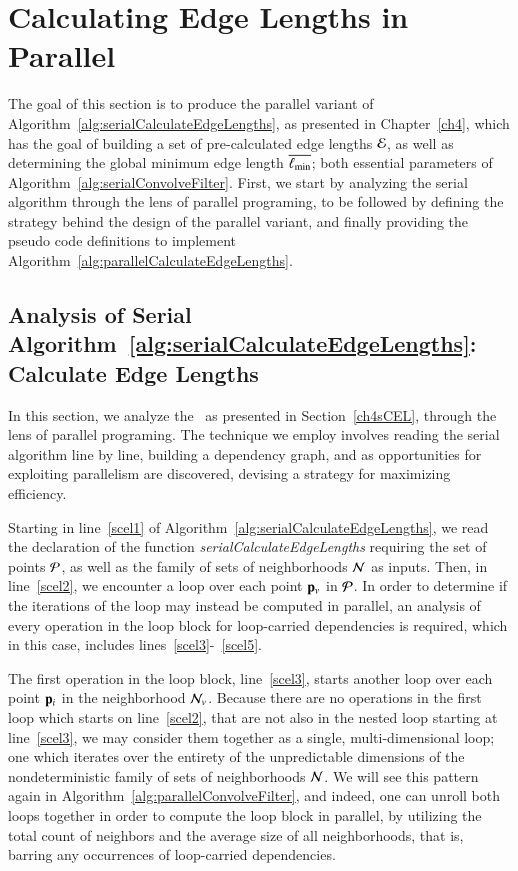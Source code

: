 %
%
%
%
\section{Calculating Edge Lengths in Parallel}
\label{ch5sCELP}
The goal of this section is to produce the parallel variant of  Algorithm~\ref{alg:serialCalculateEdgeLengths}, as presented in Chapter~\ref{ch4}, which has the goal of building a set of pre-calculated edge lengths $\mathcal{E}$, as well as determining the global minimum edge length $\overline{\ell_\text{min}}$; both essential parameters of Algorithm~\ref{alg:serialConvolveFilter}. First, we start by analyzing the serial algorithm through the lens of parallel programing, to be followed by defining the strategy behind the design of the parallel variant, and finally providing the pseudo code definitions to implement Algorithm~\ref{alg:parallelCalculateEdgeLengths}.


%
%
\subsection{Analysis of Serial Algorithm~\ref{alg:serialCalculateEdgeLengths}: Calculate Edge Lengths}
\label{ch5sCELPssASACEL}
In this section, we analyze the~ as presented in Section~\ref{ch4sCEL}, through the lens of parallel programing. The technique we employ involves reading the serial algorithm line by line, building a dependency graph, and as opportunities for exploiting parallelism are discovered, devising a strategy for maximizing efficiency.

Starting in line~\ref{scel1} of Algorithm~\ref{alg:serialCalculateEdgeLengths}, we read the declaration of the function \textit{serialCalculateEdgeLengths} requiring the set of points $\mathcal{P}$, as well as the family of sets of neighborhoods $\mathcal{N}$ as inputs. Then, in line~\ref{scel2}, we encounter a loop over each point $\mathbf{p}_v$ in $\mathcal{P}$. In order to determine if the iterations of the loop may instead be computed in parallel, an analysis of every operation in the loop block for loop-carried dependencies is required, which in this case, includes lines~\ref{scel3}-~\ref{scel5}.

The first operation in the loop block, line~\ref{scel3}, starts another loop over each point $\mathbf{p}_i$ in the neighborhood $\mathcal{N}_v$. Because there are no operations in the first loop which starts on line~\ref{scel2}, that are not also in the nested loop starting at line~\ref{scel3}, we may consider them together as a single, multi-dimensional loop; one which iterates over the entirety of the unpredictable dimensions of the nondeterministic family of sets of neighborhoods $\mathcal{N}$. We will see this pattern again in Algorithm~\ref{alg:parallelConvolveFilter}, and indeed, one can unroll both loops together in order to compute the loop block in parallel, by utilizing the total count of neighbors and the average size of all neighborhoods, that is, barring any occurrences of loop-carried dependencies.

